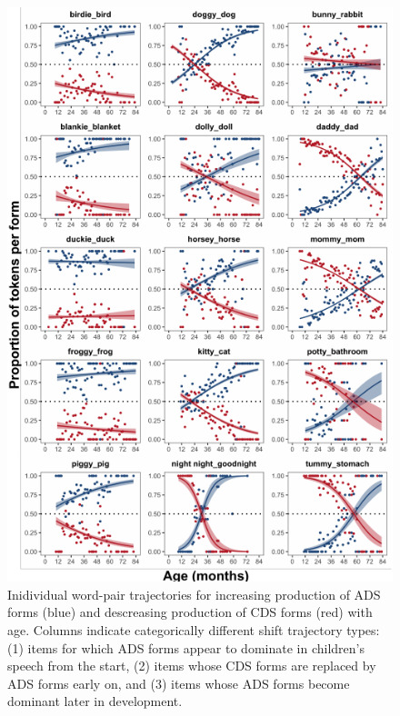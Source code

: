 \documentclass[10pt, letterpaper]{article}
\newenvironment{CodeChunk}{}{}
\begin{document}
\begin{CodeChunk}
\begin{figure}[!ht]

{\centering \includegraphics{figs/shift-timing-bypair-fig-1} 

}

\caption[Inidividual word-pair trajectories for increasing production of ADS forms (blue) and descreasing production of CDS forms (red) with age]{Inidividual word-pair trajectories for increasing production of ADS forms (blue) and descreasing production of CDS forms (red) with age. Columns indicate categorically different shift trajectory types: (1) items for which ADS forms appear to dominate in children's speech from the start, (2) items whose CDS forms are replaced by ADS forms early on, and (3) items whose ADS forms become dominant later in development.}\label{fig:shift-timing-bypair-fig}
\end{figure}
\end{CodeChunk}
\end{document}
